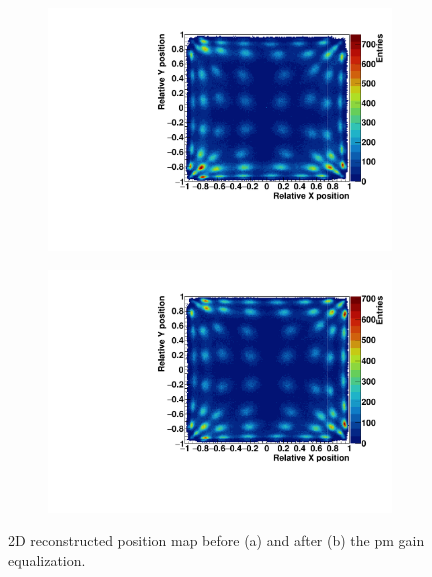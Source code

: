 \begin{figure} [!h]
\begin{subfigure}[t]{0.5\textwidth}
\centering
\includegraphics[width=1\textwidth]{03_GraphicFiles/chapter3_CLaRySproto/Absorber/images_charResults_Na22/1_Raw_FLOODMAP.pdf}
\caption{}
\label{chap3::fig::absraw_floodMap}
\end{subfigure}
\begin{subfigure}[t]{0.5\textwidth}
\centering
\includegraphics[width=1\textwidth]{03_GraphicFiles/chapter3_CLaRySproto/Absorber/images_charResults_Na22/2_Cal_FLOODMAP.pdf}
\caption{}
\label{chap3::fig::abscal_floodMap}
\end{subfigure}
\caption{2D reconstructed position map before (a) and after (b) the \gls{pm} gain equalization.}
\label{chap3::fig::absFloodMap}
\end{figure}

